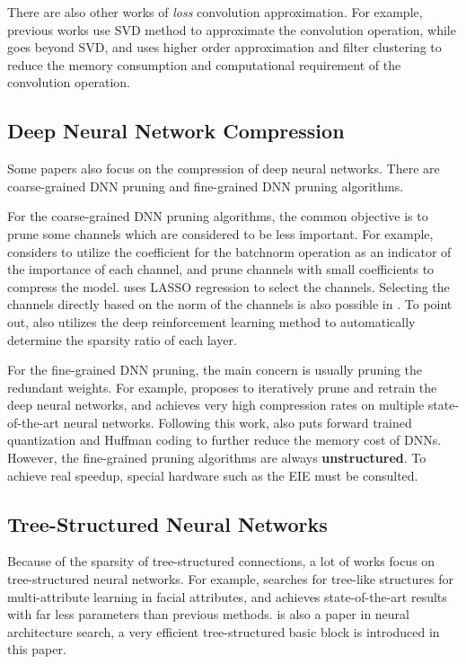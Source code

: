 \documentclass{acmtog} %
\begin{document}
There are also other works of \emph{loss} convolution approximation. For example, previous works use SVD method to approximate the convolution operation, while \cite{SVD} goes beyond SVD, and uses higher order approximation and filter clustering to reduce the memory consumption and computational requirement of the convolution operation. 
\subsection{Deep Neural Network Compression}
Some papers also focus on the compression of deep neural networks. There are coarse-grained DNN pruning and fine-grained DNN pruning algorithms.

For the coarse-grained DNN pruning algorithms, the common objective is to prune some channels which are considered to be less important. For example, \cite{networkslimming} considers to utilize the coefficient for the batchnorm operation as an indicator of the importance of each channel, and prune channels with small coefficients to compress the model. \cite{pruneverydeep} uses LASSO regression to select the channels. Selecting the channels directly based on the norm of the channels is also possible in \cite{amc}. To point out, \cite{amc} also utilizes the deep reinforcement learning method to automatically determine the sparsity ratio of each layer.

For the fine-grained DNN pruning, the main concern is usually pruning the redundant weights. For example, \cite{hansongnips15} proposes to iteratively prune and retrain the deep neural networks, and achieves very high compression rates on multiple state-of-the-art neural networks. Following this work, \cite{hansongICLR2016} also puts forward trained quantization and Huffman coding to further reduce the memory cost of DNNs. However, the fine-grained pruning algorithms are always \textbf{unstructured}. To achieve real speedup, special hardware such as the EIE \cite{EIE} must be consulted.
\subsection{Tree-Structured Neural Networks}
Because of the sparsity of tree-structured connections, a lot of works focus on tree-structured neural networks. For example, \cite{GNAS} searches for tree-like structures for multi-attribute learning in facial attributes, and achieves state-of-the-art results with far less parameters than previous methods. \cite{caihan} is also a paper in neural architecture search, a very efficient tree-structured basic block is introduced in this paper.
\end{document}
